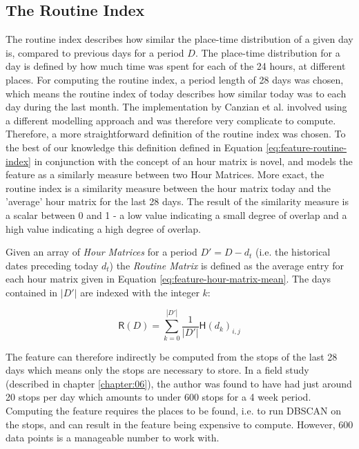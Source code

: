 \subsection{The Routine Index}
\label{sub:routine-index}
The routine index describes how similar the place-time distribution of a given day is, compared to previous days for a period $D$. The place-time distribution for a day is defined by how much time was spent for each of the 24 hours, at different places. For computing the routine index, a period length of 28 days was chosen, which means the routine index of today describes how similar today was to each day during the last month. The implementation by Canzian et al. \cite{Canzian2015} involved using a different modelling approach and was therefore very complicate to compute.  Therefore, a more straightforward definition of the routine index was chosen. To the best of our knowledge this definition defined in Equation \eqref{eq:feature-routine-index} in conjunction with the concept of an hour matrix is novel, and models the feature as a similarly measure between two Hour Matrices. More exact, the routine index is a similarity measure between the hour matrix today and the 'average' hour matrix for the last 28 days. The result of the similarity measure is a scalar between 0 and 1 - a low value indicating a small degree of overlap and a high value indicating a high degree of overlap. 

Given an array of \textit{Hour Matrices} for a period $D' = D - d_t$ (i.e. the historical dates preceding today $d_t$) the \textit{Routine Matrix} is defined as the average entry for each hour matrix given in Equation \eqref{eq:feature-hour-matrix-mean}. The days contained in $|D'|$ are indexed with the integer $k$:

\begin{equation}
\label{eq:feature-hour-matrix-mean}
\mathsf{R}(D) = \sum_{k=0}^{|D'|} \frac{1}{|D'|} \mathsf{H}(d_{k})_{i,j}
\end{equation}

The feature can therefore indirectly be computed from the stops of the last 28 days which means only the stops are necessary to store. In a field study (described in chapter \ref{chapter:06}), the author was found to have had just around 20 stops per day which amounts to under 600 stops for a 4 week period. Computing the feature requires the places to be found, i.e. to run DBSCAN on the stops, and can result in the feature being expensive to compute. However, 600 data points is a manageable number to work with.

